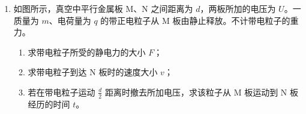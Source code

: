 \documentclass[\gkver]{gaokaozhenti}
\begin{document}
\begin{enumerate}
{根据 $v = \sqrt{v_{0}^{2} + v_{y}^{2}}$

得 $v = 10.0\Ums$；设速度方向与水平方向夹角为 $\theta$（如答图所示）


则有 $\tan\theta = \frac{v_{y}}{v_{0}} = 0.75$

（3）根据动量定理，排球与乙同学作用过程中所受冲量的大小 $I = 2mv = 6.0\UNs$
}

\item
如图所示，真空中平行金属板 M、N 之间距离为 $d$，两板所加的电压为 $U$。一质量为 $m$、电荷量为 $q$ 的带正电粒子从 M 板由静止释放。不计带电粒子的重力。
\begin{enumerate}
	\item
	求带电粒子所受的静电力的大小 $F$；
	\item
	求带电粒子到达 N 板时的速度大小 $v$；
	\item
	若在带电粒子运动 $\frac{d}{2}$ 距离时撤去所加电压，求该粒子从 M 板运动到 N 板经历的时间 $t$。
\end{enumerate}


\end{enumerate}
\end{document}
